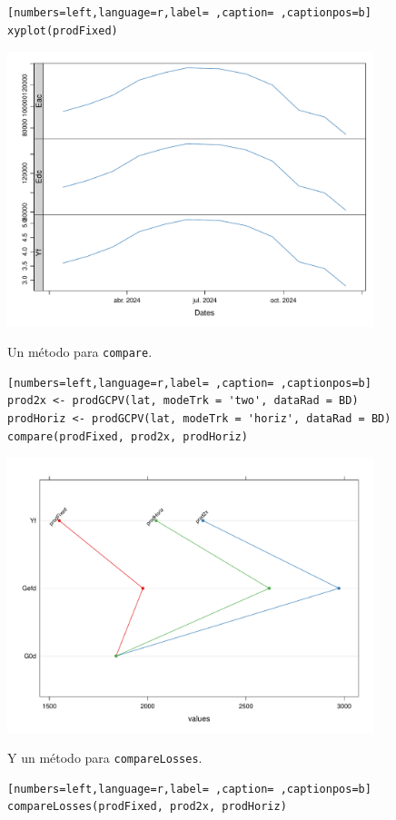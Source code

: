 \begin{lstlisting}[numbers=left,language=r,label= ,caption= ,captionpos=b]
xyplot(prodFixed)
\end{lstlisting}

\begin{center}
\includegraphics[width=0.8\textwidth]{figuras/codigo-prodgcpv.pdf}
\end{center}

Un método para \texttt{compare}.
\begin{lstlisting}[numbers=left,language=r,label= ,caption= ,captionpos=b]
prod2x <- prodGCPV(lat, modeTrk = 'two', dataRad = BD)
prodHoriz <- prodGCPV(lat, modeTrk = 'horiz', dataRad = BD)
compare(prodFixed, prod2x, prodHoriz)
\end{lstlisting}

\begin{center}
\includegraphics[width=0.8\textwidth]{figuras/codigo-prodgcpv2.pdf}
\end{center}

Y un método para \texttt{compareLosses}.
\begin{lstlisting}[numbers=left,language=r,label= ,caption= ,captionpos=b]
compareLosses(prodFixed, prod2x, prodHoriz)
\end{lstlisting}

